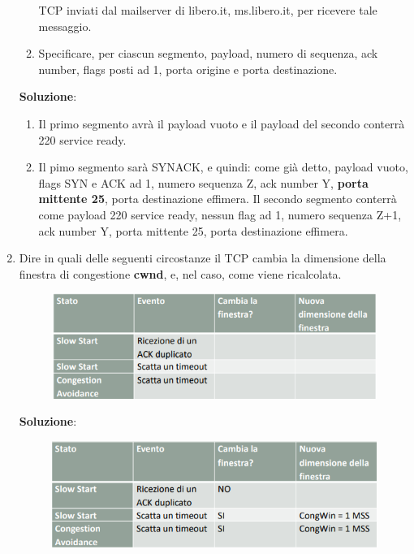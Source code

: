\documentclass[11pt,a4paper]{article}
\theoremstyle{definition}
\begin{document}
\begin{enumerate}
\begin{enumerate}
		            TCP inviati dal mailserver di libero.it, ms.libero.it,
		            per ricevere tale messaggio.
		      \item Specificare, per ciascun segmento, payload,
		            numero di sequenza, ack number, flags posti ad 1,
		            porta origine e porta destinazione.
	      \end{enumerate}
	      \textbf{Soluzione}:
	      \begin{enumerate}
		      \item Il primo segmento avrà il payload vuoto e il payload del secondo conterrà 220 service ready.
		      \item Il pimo segmento sarà SYNACK, e quindi: come già detto, payload vuoto, flags SYN e ACK ad 1, numero sequenza Z, ack number Y, \textbf{porta mittente 25}, porta destinazione effimera. Il secondo segmento conterrà come payload 220 service ready, nessun flag ad 1, numero sequenza Z+1, ack number Y, porta	mittente 25, porta destinazione effimera.
	      \end{enumerate}
	      \newpage
	\item Dire in quali delle seguenti circostanze il TCP cambia la dimensione della
	      finestra di congestione \textbf{cwnd}, e, nel caso, come viene ricalcolata.
	      \begin{figure}[!h]
		      \includegraphics[scale=0.5]{Immagini/Es5_1.png}
		      \centering
	      \end{figure}
	      \begin{flushleft}
		      \textbf{Soluzione}:
	      \end{flushleft}
	      \begin{figure}[!h]
		      \includegraphics[scale=0.5]{Immagini/Es5_2.png}

\end{figure}
\end{enumerate}
\end{document}

